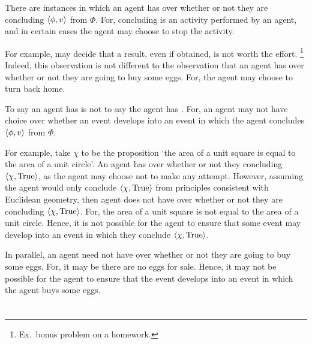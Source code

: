 \begin{note}
  There are instances in which an agent has \emph{} over whether or not they are concluding \(\langle \phi, v \rangle\) from \(\Phi\).
  For, concluding is an activity performed by an agent, and in certain cases the agent may choose to stop the activity.

  For example, may decide that a result, even if obtained, is not worth the effort.%
  \footnote{
    Ex.\ bonus problem on a homework.
  }
  Indeed, this observation is not different to the observation that an agent has  over whether or not they are going to buy some eggs.
  For, the agent may choose to turn back home.

  To say an agent has  is not to say the agent has \emph{\pinf{}}.
  For, an agent may not have choice over whether an event develops into an event in which the agent concludes \(\langle \phi, v \rangle\) from \(\Phi\).

  For example, take \(\chi\) to be the proposition `the area of a unit square is equal to the area of a unit circle'.
  An agent has  over whether or not they concluding \(\langle \chi, \text{True} \rangle\), as the agent may choose not to make any attempt.
  However, assuming the agent would only conclude \(\langle \chi, \text{True} \rangle\) from principles consistent with Euclidean geometry, then agent does not have \pinf{} over whether or not they are concluding \(\langle \chi, \text{True} \rangle\).
  For, the area of a unit square is not equal to the area of a unit circle.
  Hence, it is not possible for the agent to ensure that some event may develop into an event in which they conclude \(\langle \chi, \text{True} \rangle\).

  In parallel, an agent need not have  over whether or not they are going to buy some eggs.
  For, it may be there are no eggs for sale.
  Hence, it may not be possible for the agent to ensure that the event develops into an event in which the agent buys some eggs.
\end{note}


\section{}
\label{cha:requs:sec:definition}

